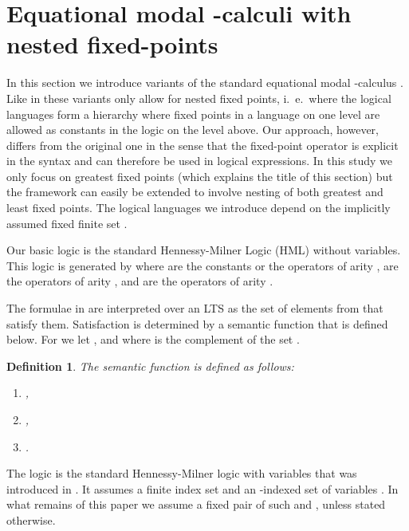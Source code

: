 \documentclass[submission]{eptcs}
\newtheorem{definition}[theorem]{Definition}
\begin{document}
\section{Equational modal -calculi with nested fixed-points}
\label{sect:hennmil}
In this section we introduce variants of the standard equational modal
-calculus \cite{Koz83}. Like in \cite{Larsen1990} these variants
only allow for nested fixed points, i.~e.~where the logical languages
form a hierarchy where fixed points in a language on one level are
allowed as constants in the logic on the level above. Our approach,
however, differs from the original one in the sense that the
fixed-point operator is explicit in the syntax and can therefore be
used in logical expressions. In this study we only focus on greatest
fixed points (which explains the title of this section) but the
framework can easily be extended to involve nesting of both greatest
and least fixed points. The logical languages we introduce depend on
the implicitly assumed fixed finite set .

Our basic logic  is the standard Hennessy-Milner Logic (HML)
\cite{HM85} without variables.  This logic is generated by
 where 
are the constants or the operators of arity ,
 are the operators of arity
, and  are the operators of arity
.

The formulae in  are interpreted over an LTS  as the set of elements from  that satisfy
them. Satisfaction is determined by a semantic function that is
defined below.  For  we let
, and  where  is the
complement of the set .
\begin{definition}\label{def:semp}\quad
The semantic function   is defined as follows:
\begin{enumerate}
\item ,
\item
  ,
\item
  .
\end{enumerate}
\end{definition}
The logic  is the standard Hennessy-Milner logic with variables
that was introduced in \cite{Larsen1990}. It assumes a finite index
set  and an -indexed set of variables . In what remains of
this paper we assume a fixed pair of such  and , unless stated
otherwise.
\end{document}
